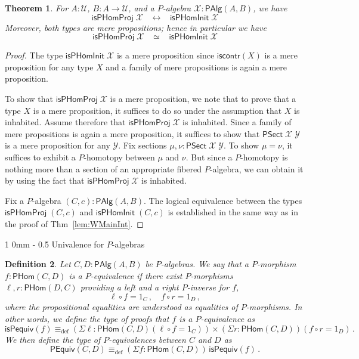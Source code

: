 \documentclass[10pt,a4paper,oneside,reqno]{amsart}
\makeatletter
\numberwithin{equation}{section}
\renewcommand{\section}{\@startsection
  {section}%
   {1}%
  {0mm}%
   {-\baselineskip}%
  {0.5\baselineskip}%
   {\Large\bfseries}}%
\theoremstyle{mythm}
\newtheorem{theorem}{Theorem}[section]
\theoremstyle{mydef}
\newtheorem{definition}[theorem]{Definition}
\theoremstyle{myrmk}
\newcommand{\ie}{\text{i.e.\ }}
\newcommand{\myemph}[1]{\textit{#1}}
\newcommand{\deq}{\equiv}
\newcommand{\defeq}{\deq_{\mathrm{def}}}
\newcommand{\co}{\colon}
\newcommand{\iscontr}{\mathsf{iscontr}}
\newcommand{\U}{\mathcal{U}}
\newcommand{\WAlg}{\mathsf{PAlg}}
\newcommand{\WHom}{\mathsf{PHom}}
\newcommand{\WFibHom}{\mathsf{PSect}}
\newcommand{\IsWHInit}{\mathsf{isPHomInit}}
\newcommand{\IsWHProj}{\mathsf{isPHomProj}}
\newcommand{\X}{\mathcal{X}}
\newcommand{\Y}{\mathcal{Y}}
\makeatother
\begin{document}
\begin{theorem}\label{lem:WMainInternal}
For $A:\U$, $B : A \to \U$, and a $P$-algebra $\X : \WAlg(A,B)$, we have
\[ \IsWHProj \; \X \;\;\; \leftrightarrow \;\;\; \IsWHInit \; \X \]
Moreover, both types are mere propositions; hence in particular we have
\[ \IsWHProj \; \X \;\;\; \simeq \;\;\; \IsWHInit \; \X \]
\end{theorem}
\begin{proof}
The type $\IsWHInit \; \X$ is a mere proposition since $\iscontr(X)$ is a mere proposition for any type $X$ and a family of mere propositions is again a mere proposition.

To show that $\IsWHProj \; \X$ is a mere proposition, we note that to prove that a type $X$ is a mere proposition, it suffices to do so under the assumption that $X$ is inhabited. Assume therefore that $\IsWHProj \; \X$ is inhabited. Since a family of mere propositions is again a mere proposition, it suffices to show that $\WFibHom \; \X \; \Y$ is a mere proposition for any $\Y$. Fix sections $\mu, \nu : \WFibHom \; \X \; \Y$. To show $\mu = \nu$, it suffices to exhibit a $P$-homotopy between $\mu$ and $\nu$. But since a $P$-homotopy is nothing more than a section of an appropriate fibered $P$-algebra, we can obtain it by using the fact that $\IsWHProj \; \X$ is inhabited.

Fix a $P$-algebra $(C,c) : \WAlg(A,B)$. The logical equivalence between the types $\IsWHProj \; (C,c)$ and $\IsWHInit \; (C,c)$ is established in the same way as in the proof of Thm~\ref{lem:WMainInt}. 
\end{proof}


\section{Univalence for $P$-algebras}

\begin{definition} Let $C,D : \WAlg(A,B)$ be $P$-algebras. We say that a $P$-morphism $f \co \WHom(C,D)$ is a \myemph{$P$-equivalence}
if there exist $P$-morphisms $\ell,r \co \WHom(D,C)$ providing a left and a right $P$-inverse for $f$, \ie 
\[ 
\ell \circ f = 1_C \, , \quad f \circ r = 1_D \, ,
\]
where the propositional equalities are understood as equalities of $P$-morphisms. In other words, we define the type of proofs that $f$ is a $P$-equivalence as
\[
\mathsf{isPequiv}(f) \defeq   ( \Sigma \ell : \WHom(C,D) ( \ell \circ f = 1_C )) \times 
    (\Sigma r : \WHom(C, D))(  f \circ r = 1_D ) \, .
\]
We then define the type of \emph{$P$-equivalences} between $C$ and $D$ as
\[
\mathsf{PEquiv}(C, D)
\defeq    (\Sigma f : \WHom(C,D)) \, \mathsf{isPequiv}(f)  \, . 
\] 
\end{definition}
\end{document}
